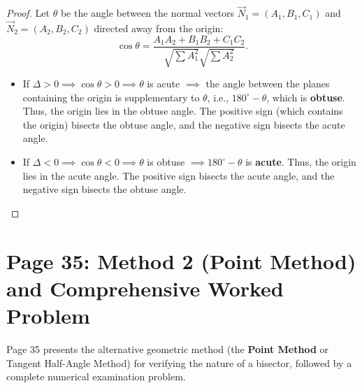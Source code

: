 \begin{proof}
Let $\theta$ be the angle between the normal vectors $\vec{N}_1 = (A_1, B_1, C_1)$ and $\vec{N}_2 = (A_2, B_2, C_2)$ directed away from the origin:
\begin{equation}
    \cos\theta = \frac{A_1 A_2 + B_1 B_2 + C_1 C_2}{\sqrt{\sum A_1^2}\sqrt{\sum A_2^2}}.
\end{equation}
\begin{itemize}
    \item If $\Delta > 0 \implies \cos\theta > 0 \implies \theta$ is acute $\implies$ the angle between the planes containing the origin is supplementary to $\theta$, i.e., $180^\circ - \theta$, which is \textbf{obtuse}.
    Thus, the origin lies in the obtuse angle.
    The positive sign (which contains the origin) bisects the obtuse angle, and the negative sign bisects the acute angle.
    \item If $\Delta < 0 \implies \cos\theta < 0 \implies \theta$ is obtuse $\implies 180^\circ - \theta$ is \textbf{acute}.
    Thus, the origin lies in the acute angle.
    The positive sign bisects the acute angle, and the negative sign bisects the obtuse angle.
\end{itemize}
\end{proof}

\section{Page 35: Method 2 (Point Method) and Comprehensive Worked Problem}
\label{sec:page35}

\begin{conceptbox}
Page 35 presents the alternative geometric method (the \textbf{Point Method} or Tangent Half-Angle Method) for verifying the nature of a bisector, followed by a complete numerical examination problem.
\end{conceptbox}

